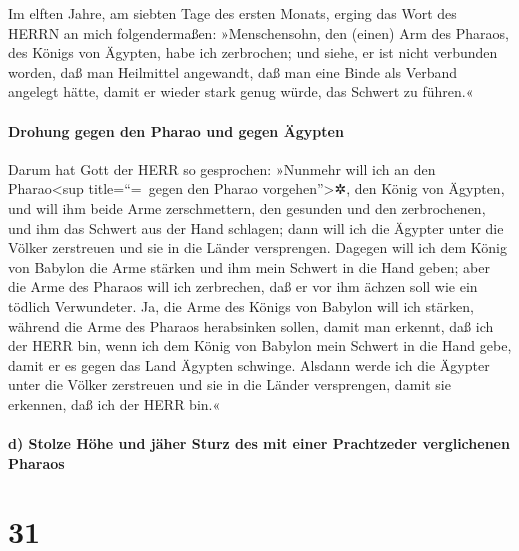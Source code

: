 Im elften Jahre, am siebten Tage des ersten Monats,
erging das Wort des HERRN an mich folgendermaßen:
»Menschensohn, den (einen) Arm des Pharaos, des Königs
von Ägypten, habe ich zerbrochen; und siehe, er ist nicht verbunden
worden, daß man Heilmittel angewandt, daß man eine Binde als Verband
angelegt hätte, damit er wieder stark genug würde, das Schwert zu
führen.«

\hypertarget{drohung-gegen-den-pharao-und-gegen-uxe4gypten}{%
\paragraph{Drohung gegen den Pharao und gegen
Ägypten}\label{drohung-gegen-den-pharao-und-gegen-uxe4gypten}}

Darum hat Gott der HERR so gesprochen: »Nunmehr will ich
an den Pharao\textless sup title=``=~gegen den Pharao
vorgehen''\textgreater✲, den König von Ägypten, und will ihm beide Arme
zerschmettern, den gesunden und den zerbrochenen, und ihm das Schwert
aus der Hand schlagen; dann will ich die Ägypter unter
die Völker zerstreuen und sie in die Länder versprengen.
Dagegen will ich dem König von Babylon die Arme stärken
und ihm mein Schwert in die Hand geben; aber die Arme des Pharaos will
ich zerbrechen, daß er vor ihm ächzen soll wie ein tödlich Verwundeter.
Ja, die Arme des Königs von Babylon will ich stärken,
während die Arme des Pharaos herabsinken sollen, damit man erkennt, daß
ich der HERR bin, wenn ich dem König von Babylon mein Schwert in die
Hand gebe, damit er es gegen das Land Ägypten schwinge.
Alsdann werde ich die Ägypter unter die Völker zerstreuen
und sie in die Länder versprengen, damit sie erkennen, daß ich der HERR
bin.«

\hypertarget{d-stolze-huxf6he-und-juxe4her-sturz-des-mit-einer-prachtzeder-verglichenen-pharaos}{%
\paragraph{d) Stolze Höhe und jäher Sturz des mit einer Prachtzeder
verglichenen
Pharaos}\label{d-stolze-huxf6he-und-juxe4her-sturz-des-mit-einer-prachtzeder-verglichenen-pharaos}}

\hypertarget{section-30}{%
\section{31}\label{section-30}}

